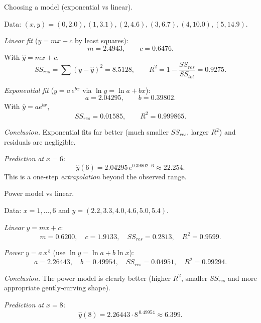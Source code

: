 \documentclass[11pt]{article}
\def\textbf#1{#1}%
\def\mathrm#1{#1}%
\begin{document}
\begin{solution}
\textbf{Choosing a model (exponential vs linear).}

Data: $(x,y)=(0,2.0),(1,3.1),(2,4.6),(3,6.7),(4,10.0),(5,14.9)$.

\emph{Linear fit} ($y=mx+c$ by least squares):
\[
m=2.4943,\qquad c=0.6476.
\]
With $\hat y=mx+c$,
\[
SS_{\mathrm{res}}=\sum (y-\hat y)^2=8.5128,\qquad
R^2=1-\frac{SS_{\mathrm{res}}}{SS_{\mathrm{tot}}}=0.9275.
\]

\emph{Exponential fit} ($y=a\,e^{bx}$ via $\ln y=\ln a+bx$):
\[
a=2.04295,\qquad b=0.39802.
\]
With $\hat y=a e^{bx}$,
\[
SS_{\mathrm{res}}=0.01585,\qquad R^2=0.999865.
\]

\emph{Conclusion.} Exponential fits far better (much smaller $SS_{\mathrm{res}}$, larger $R^2$) and residuals are negligible.

\emph{Prediction at $x=6$:}
\[
\hat y(6)=2.04295\,e^{0.39802\cdot6}\approx \boxed{22.254}.
\]
This is a one-step \emph{extrapolation} beyond the observed range.
\end{solution}

\begin{solution}
\textbf{Power model vs linear.}

Data: $x=1,\dots,6$ and $y=(2.2,3.3,4.0,4.6,5.0,5.4)$.

\emph{Linear} $y=mx+c$:
\[
m=0.6200,\quad c=1.9133,\quad SS_{\mathrm{res}}=0.2813,\quad R^2=0.9599.
\]

\emph{Power} $y=a\,x^{\,b}$ (use $\ln y=\ln a+b\ln x$):
\[
a=2.26443,\quad b=0.49954,\quad SS_{\mathrm{res}}=0.04951,\quad R^2=0.99294.
\]

\emph{Conclusion.} The power model is clearly better (higher $R^2$, smaller $SS_{\mathrm{res}}$ and more appropriate gently‐curving shape).

\emph{Prediction at $x=8$:}
\[
\hat y(8)=2.26443\cdot 8^{\,0.49954}\approx \boxed{6.399}.
\]
\end{solution}
\end{document}

